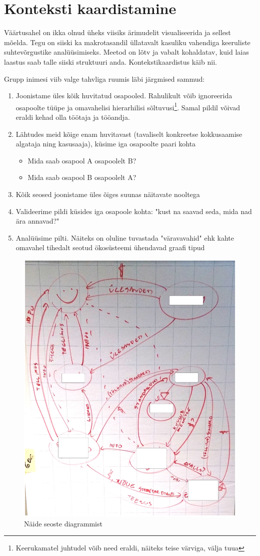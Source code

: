 \documentclass{tufte-book}
\begin{document}
\section{Konteksti kaardistamine}
Väärtusahel on ikka olnud üheks viisiks ärimudelit visualiseerida ja sellest mõelda. Tegu on siiski ka makrotasandil üllatavalt kasuliku vahendiga keeruliste suhtevõrgustike analüüsimiseks. Meetod on lõtv ja vabalt kohaldatav, kuid laias laastus saab talle siiski struktuuri anda. Kontekstikaardistus käib nii. 

Grupp inimesi viib valge tahvliga ruumis läbi järgmised sammud:
\begin{enumerate}
	\item Joonistame üles kõik huvitatud osapooled. Rahulikult võib ignoreerida osapoolte tüüpe ja omavahelisi hierarhilisi sõltuvusi\footnote{Keerukamatel juhtudel võib need eraldi, näiteks teise värviga, välja tuua}. Samal pildil võivad eraldi kehad olla töötaja ja tööandja. 
	\item Lähtudes meid kõige enam huvitavast (tavaliselt konkreetse kokkusaamise algataja ning kasusaaja), küsime iga osapoolte paari kohta
		\begin{itemize}
			\item Mida saab osapool A osapoolelt B?
			\item Mida saab osapool B osapoolelt A?
		\end{itemize}
	\item Kõik seosed joonistame üles õiges suunas näitavate nooltega 
	\item Valideerime pildi küsides iga osapoole kohta: "kust na saavad seda, mida nad ära annavad?"
	\item Analüüsime pilti. Näiteks on oluline tuvastada "väravavahid" ehk kahte omavahel tihedalt seotud ökosüsteemi ühendavad graafi tipud
\end{enumerate}

\begin{figure}[h]
	\begin{center}
		\includegraphics[width=.7\textwidth]{seosed.jpg}
		\caption{Näide seoste diagrammist}
		\label{fig:seosed}
	\end{center}
\end{figure}
\end{document}

